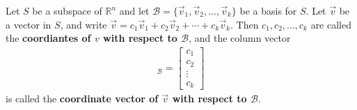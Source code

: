 \documentclass{article}
\begin{document}
\begin{definition}
    Let $S$ be a subspace of $\mathbb{R}^n$ and let $\mathcal{B}=\{\vec v_1, \vec v_2, ..., \vec v_k\}$ be a basis for $S$. Let $\vec v$ be a vector in $S$, and write $\vec v = c_1\vec v_1 + c_2\vec v_2 + \cdots + c_k\vec v_k$. Then $c_1, c_2, ..., c_k$ are called the \textbf{coordiantes of $v$ with respect to $\mathcal{B}$}, and the column vector
    \begin{gather*}
        [\vec v]_\mathcal{B} = \begin{bmatrix}
            c_1 \\c_2\\\vdots\\c_k
        \end{bmatrix}
    \end{gather*}
    is called the \textbf{coordinate vector of $\vec v$ with respect to $\mathcal{B}$}.
\end{definition}
\setcounter{subsection}{5}
\end{document}
